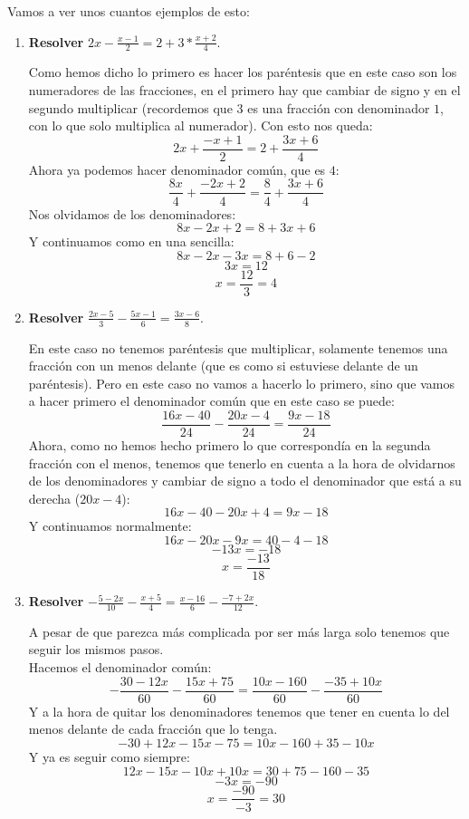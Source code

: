 \documentclass[a4paper,11pt,answers]{exam}
\begin{document}
  Vamos a ver unos cuantos ejemplos de esto:
  \begin{enumerate}
  \item \textbf{Resolver} $2x - \frac{x-1}{2} = 2 + 3*\frac{x +2}{4}$.
    \begin{solution}
      Como hemos dicho lo primero es hacer los paréntesis que en este caso son los numeradores de las fracciones, en el primero hay que cambiar de signo y en el segundo multiplicar (recordemos que $3$ es una fracción con denominador $1$, con lo que solo multiplica al numerador). Con esto nos queda:
      \[2x + \frac{-x+1}{2} = 2 + \frac{3x +6}{4}\]
      Ahora ya podemos hacer denominador común, que es $4$:
      \[\frac{8x}{4} + \frac{-2x + 2}{4} = \frac{8}{4} + \frac{3x+6}{4}\]
      Nos olvidamos de los denominadores:
      \[8x -2x + 2 = 8 + 3x + 6\]
      Y continuamos como en una sencilla:
      \[8x - 2x - 3x = 8+6 - 2\]
      \[3x = 12\]
      \[x = \frac{12}{3} = 4\]
    \end{solution}
    
  \item \textbf{Resolver} $\frac{2x-5}{3} - \frac{5x-1}{6} = \frac{3x-6}{8}$.
    \begin{solution}
      En este caso no tenemos paréntesis que multiplicar, solamente tenemos una fracción con un menos delante (que es como si estuviese delante de un paréntesis). Pero en este caso no vamos a hacerlo lo primero, sino que vamos a hacer primero el denominador común que en este caso se puede:
      \[\frac{16x - 40}{24} - \frac{20x - 4}{24} = \frac{9x - 18}{24}\]
      Ahora, como no hemos hecho primero lo que correspondía en la segunda fracción con el menos, tenemos que tenerlo en cuenta a la hora de olvidarnos de los denominadores y cambiar de signo a todo el denominador que está a su derecha ($20x - 4$):
      \[16x - 40 -20x + 4 = 9x - 18\]
      Y continuamos normalmente:
      \[16x - 20x - 9x = 40 - 4 - 18\]
      \[-13x = -18\]
      \[x = \frac{-13}{18}\]
    \end{solution}
    
  \item \textbf{Resolver} $-\frac{5-2x}{10} - \frac{x+5}{4} = \frac{x-16}{6} - \frac{-7+2x}{12}$.
    \begin{solution}
      A pesar de que parezca más complicada por ser más larga solo tenemos que seguir los mismos pasos.\\
      Hacemos el denominador común:
      \[-\frac{30 - 12x}{60} - \frac{15x + 75}{60} = \frac{10x - 160}{60} - \frac{-35 + 10 x}{60}\]
      Y a la hora de quitar los denominadores tenemos que tener en cuenta lo del menos delante de cada fracción que lo tenga.
      \[-30 + 12x - 15x - 75 = 10x - 160 + 35 - 10x\]
      Y ya es seguir como siempre:
      \[12x - 15x - 10x + 10x = 30+75-160-35\]
      \[-3x = -90\]
      \[x = \frac{-90}{-3}  = 30\]
    \end{solution}

  \end{enumerate}
\end{document}
